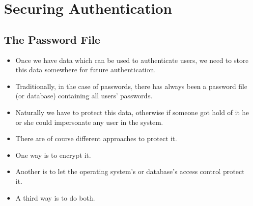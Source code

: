 \section[Securing]{Securing Authentication}

\subsection{The Password File}

\begin{frame}
  \begin{itemize}
    \item Once we have data which can be used to authenticate users, we need to 
      store this data somewhere for future authentication.

    \item Traditionally, in the case of passwords, there has always been a 
      password file (or database) containing all users' passwords.

    \item Naturally we have to protect this data, otherwise if someone got hold 
      of it he or she could impersonate any user in the system.

  \end{itemize}
\end{frame}

\begin{frame}
  \begin{itemize}
    \item There are of course different approaches to protect it.

    \item One way is to encrypt it.

    \item Another is to let the operating system's or database's access control 
      protect it.

    \item A third way is to do both.

  \end{itemize}
\end{frame}


